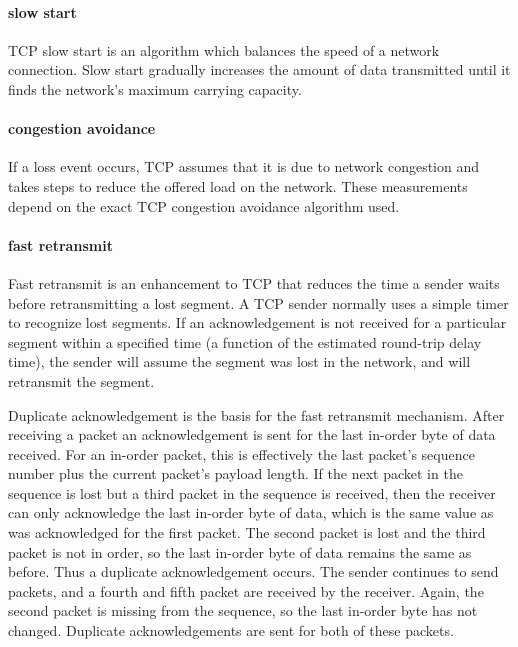 \begin{extrainfo}
\paragraph{slow start}
\acs{TCP} slow start is an algorithm which balances the speed of a network connection.
Slow start gradually increases the amount of data transmitted until it finds the network's maximum carrying capacity.

\paragraph{congestion avoidance}
If a loss event occurs, \acs{TCP} assumes that it is due to network congestion and takes steps to reduce the offered load on the network.
These measurements depend on the exact \acs{TCP} congestion avoidance algorithm used.

\paragraph{fast retransmit}
Fast retransmit is an enhancement to \acs{TCP} that reduces the time a sender waits before retransmitting a lost segment.
A \acs{TCP} sender normally uses a simple timer to recognize lost segments.
If an acknowledgement is not received for a particular segment within a specified time (a function of the estimated round-trip delay time), the sender will assume the segment was lost in the network, and will retransmit the segment.

Duplicate acknowledgement is the basis for the fast retransmit mechanism.
After receiving a packet an acknowledgement is sent for the last in-order byte of data received.
For an in-order packet, this is effectively the last packet's sequence number plus the current packet's payload length.
If the next packet in the sequence is lost but a third packet in the sequence is received, then the receiver can only acknowledge the last in-order byte of data, which is the same value as was acknowledged for the first packet.
The second packet is lost and the third packet is not in order, so the last in-order byte of data remains the same as before.
Thus a duplicate acknowledgement occurs.
The sender continues to send packets, and a fourth and fifth packet are received by the receiver.
Again, the second packet is missing from the sequence, so the last in-order byte has not changed.
Duplicate acknowledgements are sent for both of these packets.


\end{extrainfo}
